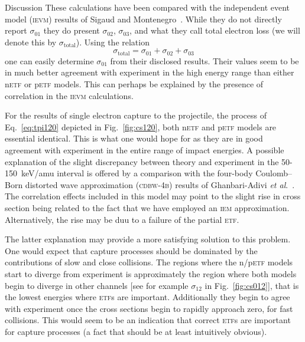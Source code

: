\documentclass[aps, pra, reprint, groupedaddress, amsfonts, longbibliography,
               amsmath, amssymb, showpacs, nofootinbib]{revtex4-1}
\begin{document}
\begin{section}{Discussion \label{sec:disc}}
   These calculations have been compared with the independent event model (\textsc{ievm}) results of
   Sigaud and Montenegro~\cite{SM-03}. While they do not directly report $\sigma_{01}$ they do present
   $\sigma_{02}$, $\sigma_{03}$, and what they call total electron loss (we will denote this by
   $\sigma_\mathrm{total}$). Using the relation
   \begin{equation} \label{eq:total}
      \sigma_\mathrm{total} = \sigma_{01} + \sigma_{02} + \sigma_{03}
   \end{equation}
   one can easily determine $\sigma_{01}$ from their disclosed results. Their values seem to be in much
   better agreement with experiment in the high energy range than either n\textsc{etf} or p\textsc{etf}
   models. This can perhaps be explained by the presence of correlation in the \textsc{ievm}
   calculations.

   For the results of single electron capture to the projectile, the process of Eq.~\eqref{eq:tpi120}
   depicted in Fig.~\ref{fig:cs120}, both n\textsc{etf} and p\textsc{etf} models are essential
   identical. This is what one would hope for as they are in good agreement with experiment in the
   entire range of impact energies. A possible explanation of the slight discrepancy between theory and
   experiment in the 50-150~keV/amu interval is offered by a comparison with the four-body Coulomb–Born
   distorted wave approximation (\textsc{cdbw-4b}) results of Ghanbari-Adivi
   \textit{et al}.~\cite{GAG15}. The correlation effects included in this model may point to the slight
   rise in cross section being related to the fact that we have employed an \textsc{iem} approximation.
   Alternatively, the rise may be duu to a failure of the partial \textsc{etf}.

   The latter explanation may provide a more satisfying solution to this problem. One would expect that
   capture processes should be dominated by the contributions of slow and close collisions. The regions
   where the n/p\textsc{etf} models start to diverge from experiment is approximately the region where
   both models begin to diverge in other channels [see for example $\sigma_{12}$ in
   Fig.~\ref{fig:cs012}], that is the lowest energies where \textsc{etf}s are important.
   Additionally they begin to agree with experiment once the cross sections begin to rapidly approach
   zero, for fast collisions. This would seem to be an indication that correct \textsc{etf}s are
   important for capture processes (a fact that should be at least intuitively obvious).


\end{section}
\end{document}
